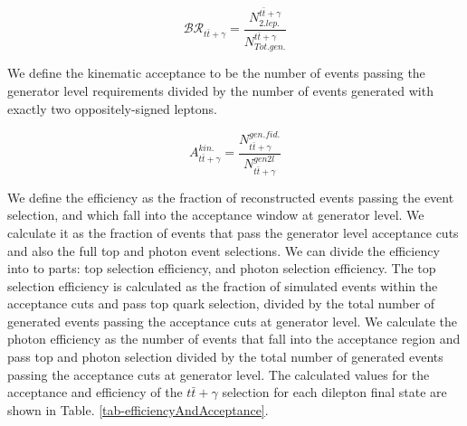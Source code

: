 \begin{equation}
\mathcal{BR}_{t\bar{t}+\gamma} = \frac{N_{2. lep.}^{t\bar{t}+\gamma}}{N_{Tot. gen.}^{t\bar{t}+\gamma}}
\end{equation} 

We define the kinematic acceptance to be the number of events passing the generator level requirements divided by the number of events generated with exactly two oppositely-signed leptons.

\begin{equation}
A_{t\bar{t}+\gamma}^{kin.} = \frac{N_{t\bar{t}+\gamma}^{gen. fid.}}{N_{t\bar{t}+\gamma}^{gen 2l}}
\end{equation} 


We define the efficiency as the fraction of reconstructed events passing the event selection, and which fall into the acceptance window at generator level. We calculate it as the fraction of events that pass the generator level acceptance cuts and also the full top and photon event selections. We can divide the efficiency into to parts: top selection efficiency, and photon selection efficiency. The top selection efficiency is calculated as the fraction of simulated events within the acceptance cuts and pass top quark selection, divided by the total number of generated events passing the acceptance cuts at generator level. We calculate the photon efficiency as the number of events that fall into the acceptance region and pass top and photon selection divided by the total number of generated events passing the acceptance cuts at generator level. The calculated values for the acceptance and efficiency of the $t\bar{t}+\gamma$ selection for each dilepton final state are shown in Table. \ref{tab-efficiencyAndAcceptance}.


